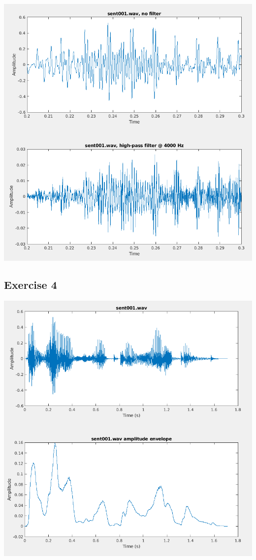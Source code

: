 \documentclass[11pt]{article}
\begin{document}
\includegraphics[width=\textwidth]{exercise3.png}

\subsection{Exercise 4}



\includegraphics[width=\textwidth]{exercise4.png}
\end{document}
